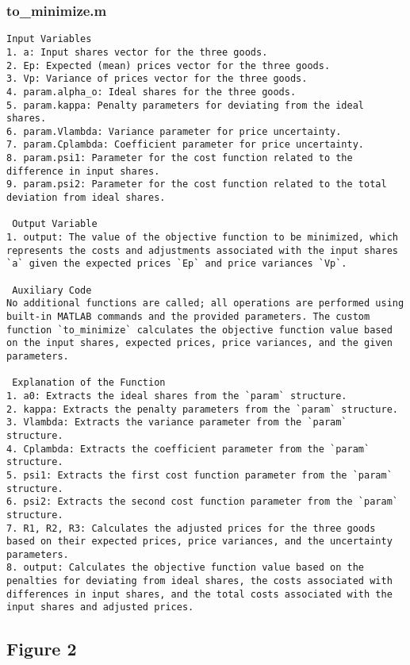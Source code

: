 \documentclass[11pt]{article}
\theoremstyle{definition}
\newcommand{\codepath}{F:/12004835/replication_package_final/replication_package_final}
\begin{document}
	\subsubsection{to\_minimize.m}
	\begin{lstlisting}[style=Matlab]
 Input Variables
1. a: Input shares vector for the three goods.
2. Ep: Expected (mean) prices vector for the three goods.
3. Vp: Variance of prices vector for the three goods.
4. param.alpha_o: Ideal shares for the three goods.
5. param.kappa: Penalty parameters for deviating from the ideal shares.
6. param.Vlambda: Variance parameter for price uncertainty.
7. param.Cplambda: Coefficient parameter for price uncertainty.
8. param.psi1: Parameter for the cost function related to the difference in input shares.
9. param.psi2: Parameter for the cost function related to the total deviation from ideal shares.

 Output Variable
1. output: The value of the objective function to be minimized, which represents the costs and adjustments associated with the input shares `a` given the expected prices `Ep` and price variances `Vp`.

 Auxiliary Code
No additional functions are called; all operations are performed using built-in MATLAB commands and the provided parameters. The custom function `to_minimize` calculates the objective function value based on the input shares, expected prices, price variances, and the given parameters.

 Explanation of the Function
1. a0: Extracts the ideal shares from the `param` structure.
2. kappa: Extracts the penalty parameters from the `param` structure.
3. Vlambda: Extracts the variance parameter from the `param` structure.
4. Cplambda: Extracts the coefficient parameter from the `param` structure.
5. psi1: Extracts the first cost function parameter from the `param` structure.
6. psi2: Extracts the second cost function parameter from the `param` structure.
7. R1, R2, R3: Calculates the adjusted prices for the three goods based on their expected prices, price variances, and the uncertainty parameters.
8. output: Calculates the objective function value based on the penalties for deviating from ideal shares, the costs associated with differences in input shares, and the total costs associated with the input shares and adjusted prices.
	\end{lstlisting}
	
	
	\subsection{Figure 2}
\end{document}
